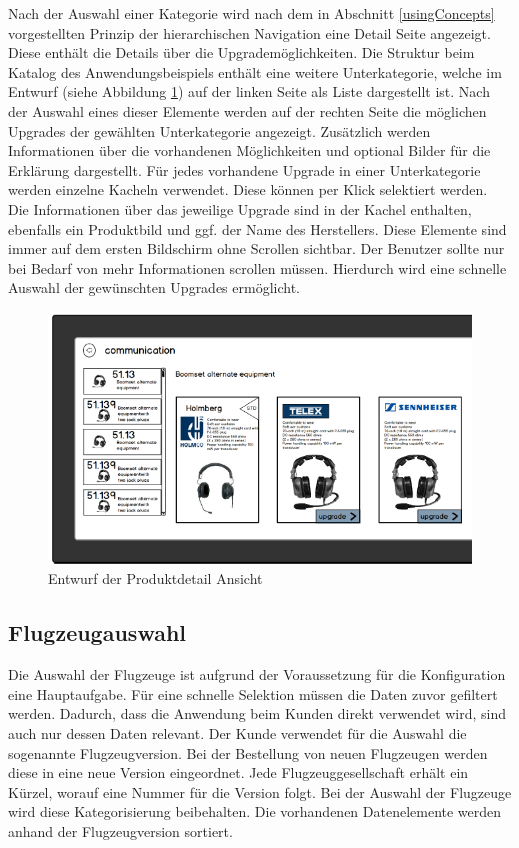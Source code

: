 Nach der Auswahl einer Kategorie wird nach dem in Abschnitt \ref{usingConcepts} vorgestellten Prinzip der hierarchischen Navigation eine Detail Seite angezeigt. Diese enthält die Details über die Upgrademöglichkeiten. Die Struktur beim Katalog des Anwendungsbeispiels enthält eine weitere Unterkategorie, welche im Entwurf (siehe Abbildung \ref{detailSketch}) auf der linken Seite als Liste dargestellt ist. Nach der Auswahl eines dieser Elemente werden auf der rechten Seite die möglichen Upgrades der gewählten Unterkategorie angezeigt. Zusätzlich werden Informationen über die vorhandenen Möglichkeiten und optional Bilder für die Erklärung dargestellt.  Für jedes vorhandene Upgrade in einer Unterkategorie werden einzelne Kacheln verwendet. Diese können per Klick selektiert werden. Die Informationen über das jeweilige Upgrade sind in der Kachel enthalten, ebenfalls ein Produktbild und ggf. der Name des Herstellers. Diese Elemente sind immer auf dem ersten Bildschirm ohne Scrollen sichtbar. Der Benutzer sollte nur bei Bedarf von mehr Informationen scrollen müssen. Hierdurch wird eine schnelle Auswahl der gewünschten Upgrades ermöglicht. 
\begin{figure}[H]
\centering
\includegraphics[width=\hsize]{images/detail_entwurf}
\caption{Entwurf der Produktdetail Ansicht}
\label{detailSketch}
\end{figure}

\subsection{Flugzeugauswahl}
Die Auswahl der Flugzeuge ist aufgrund der Voraussetzung für die Konfiguration eine Hauptaufgabe. Für eine schnelle Selektion müssen die Daten zuvor gefiltert werden. Dadurch, dass die Anwendung beim Kunden direkt verwendet wird, sind auch nur dessen Daten relevant. Der Kunde verwendet für die Auswahl die sogenannte Flugzeugversion. Bei der Bestellung von neuen Flugzeugen werden diese in eine neue Version eingeordnet. Jede Flugzeuggesellschaft erhält ein Kürzel, worauf eine Nummer für die Version folgt. Bei der Auswahl der Flugzeuge wird diese Kategorisierung beibehalten. Die vorhandenen Datenelemente werden anhand der Flugzeugversion sortiert. \par

